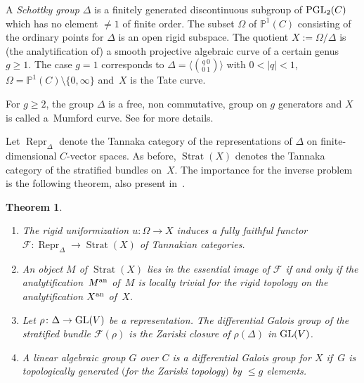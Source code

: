 \documentclass[pdftex]{sigma}
\numberwithin{equation}{section}
\newtheorem{Theorem}{Theorem}[section]
\begin{document}
A {\it Schottky group $\Delta$} is a finitely generated discontinuous subgroup of ${\rm PGL}_2(C)$ which has no element $\neq 1$ of finite order. The subset $\Omega$ of $\mathbb{P}^1(C)$ consisting of the ordinary points for $\Delta$ is an open rigid subspace. The quotient $X:=\Omega/\Delta$ is (the analytification of) a smooth projective algebraic curve of a certain genus $g\geq 1$. The case $g=1$ corresponds to $\Delta =\big\langle {q\ 0\choose 0\ 1 }\big\rangle$ with $0<|q|<1$, $\Omega =\mathbb{P}^1(C)\setminus \{0,\infty\}$ and~$X$ is the Tate curve.

For $g\geq 2$, the group $\Delta$ is a free, non commutative, group on $g$ generators and $X$ is called a~Mumford curve. See \cite{Ge-vdP} for more details.

Let $\operatorname{Repr}_\Delta$ denote the Tannaka category of the representations of $\Delta$ on finite-dimensional $C$-vector spaces. As before, $\operatorname{Strat}(X)$ denotes the Tannaka category of the stratified bundles on~$X$. The importance for the inverse problem is the following theorem, also present in~\cite{Sa}.

\begin{Theorem}\label{4.2}\quad
\begin{enumerate}\itemsep=0pt
\item[$(1)$] The rigid uniformization $u\colon \Omega \rightarrow X$ induces a fully faithful functor $\mathcal{F}\colon \operatorname{Repr}_\Delta \rightarrow \operatorname{Strat}(X)$ of Tannakian categories.
\item[$(2)$] An object $M$ of $\operatorname{Strat}(X)$ lies in the essential image of $\mathcal{F}$ if and only if the analytifica\-tion~$M^{\rm an}$ of~$M$ is locally trivial for the rigid topology on the analytification $X^{\rm an}$ of~$X$.
\item[$(3)$]Let $\rho\colon \Delta \rightarrow {\rm GL}(V)$ be a representation. The differential Galois group of the stratified bundle $\mathcal{F}(\rho)$ is the Zariski closure of $\rho(\Delta)$ in ${\rm GL}(V)$.
\item[$(3)$]A linear algebraic group $G$ over $C$ is a differential Galois group for $X$ if~$G$ is topologically generated $($for the Zariski topology$)$ by $\leq g$ elements.
\end{enumerate}
\end{Theorem}
\end{document}
